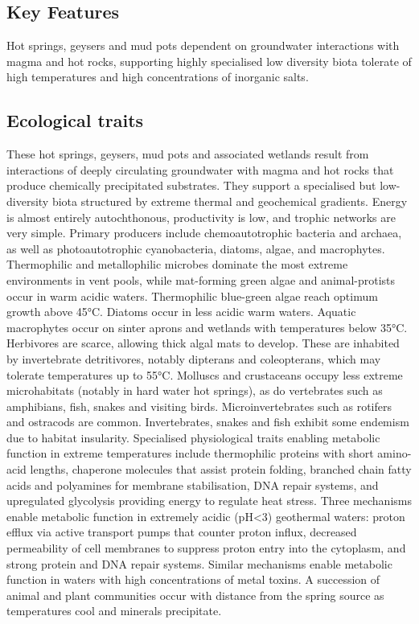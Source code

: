 \documentclass[
  letterpaper,
  DIV=11,
  numbers=noendperiod]{scrartcl}
\begin{document}
\subsection{Key Features}\label{key-features-16}

Hot springs, geysers and mud pots dependent on groundwater interactions
with magma and hot rocks, supporting highly specialised low diversity
biota tolerate of high temperatures and high concentrations of inorganic
salts.

\subsection{Ecological traits}\label{ecological-traits-16}

These hot springs, geysers, mud pots and associated wetlands result from
interactions of deeply circulating groundwater with magma and hot rocks
that produce chemically precipitated substrates. They support a
specialised but low-diversity biota structured by extreme thermal and
geochemical gradients. Energy is almost entirely autochthonous,
productivity is low, and trophic networks are very simple. Primary
producers include chemoautotrophic bacteria and archaea, as well as
photoautotrophic cyanobacteria, diatoms, algae, and macrophytes.
Thermophilic and metallophilic microbes dominate the most extreme
environments in vent pools, while mat-forming green algae and
animal-protists occur in warm acidic waters. Thermophilic blue-green
algae reach optimum growth above 45°C. Diatoms occur in less acidic warm
waters. Aquatic macrophytes occur on sinter aprons and wetlands with
temperatures below 35°C. Herbivores are scarce, allowing thick algal
mats to develop. These are inhabited by invertebrate detritivores,
notably dipterans and coleopterans, which may tolerate temperatures up
to 55°C. Molluscs and crustaceans occupy less extreme microhabitats
(notably in hard water hot springs), as do vertebrates such as
amphibians, fish, snakes and visiting birds. Microinvertebrates such as
rotifers and ostracods are common. Invertebrates, snakes and fish
exhibit some endemism due to habitat insularity. Specialised
physiological traits enabling metabolic function in extreme temperatures
include thermophilic proteins with short amino-acid lengths, chaperone
molecules that assist protein folding, branched chain fatty acids and
polyamines for membrane stabilisation, DNA repair systems, and
upregulated glycolysis providing energy to regulate heat stress. Three
mechanisms enable metabolic function in extremely acidic (pH\textless3)
geothermal waters: proton efflux via active transport pumps that counter
proton influx, decreased permeability of cell membranes to suppress
proton entry into the cytoplasm, and strong protein and DNA repair
systems. Similar mechanisms enable metabolic function in waters with
high concentrations of metal toxins. A succession of animal and plant
communities occur with distance from the spring source as temperatures
cool and minerals precipitate.
\end{document}
